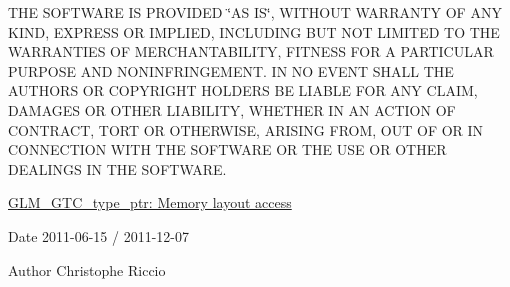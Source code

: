 \-T\-H\-E \-S\-O\-F\-T\-W\-A\-R\-E \-I\-S \-P\-R\-O\-V\-I\-D\-E\-D \char`\"{}\-A\-S I\-S\char`\"{}, \-W\-I\-T\-H\-O\-U\-T \-W\-A\-R\-R\-A\-N\-T\-Y \-O\-F \-A\-N\-Y \-K\-I\-N\-D, \-E\-X\-P\-R\-E\-S\-S \-O\-R \-I\-M\-P\-L\-I\-E\-D, \-I\-N\-C\-L\-U\-D\-I\-N\-G \-B\-U\-T \-N\-O\-T \-L\-I\-M\-I\-T\-E\-D \-T\-O \-T\-H\-E \-W\-A\-R\-R\-A\-N\-T\-I\-E\-S \-O\-F \-M\-E\-R\-C\-H\-A\-N\-T\-A\-B\-I\-L\-I\-T\-Y, \-F\-I\-T\-N\-E\-S\-S \-F\-O\-R \-A \-P\-A\-R\-T\-I\-C\-U\-L\-A\-R \-P\-U\-R\-P\-O\-S\-E \-A\-N\-D \-N\-O\-N\-I\-N\-F\-R\-I\-N\-G\-E\-M\-E\-N\-T. \-I\-N \-N\-O \-E\-V\-E\-N\-T \-S\-H\-A\-L\-L \-T\-H\-E \-A\-U\-T\-H\-O\-R\-S \-O\-R \-C\-O\-P\-Y\-R\-I\-G\-H\-T \-H\-O\-L\-D\-E\-R\-S \-B\-E \-L\-I\-A\-B\-L\-E \-F\-O\-R \-A\-N\-Y \-C\-L\-A\-I\-M, \-D\-A\-M\-A\-G\-E\-S \-O\-R \-O\-T\-H\-E\-R \-L\-I\-A\-B\-I\-L\-I\-T\-Y, \-W\-H\-E\-T\-H\-E\-R \-I\-N \-A\-N \-A\-C\-T\-I\-O\-N \-O\-F \-C\-O\-N\-T\-R\-A\-C\-T, \-T\-O\-R\-T \-O\-R \-O\-T\-H\-E\-R\-W\-I\-S\-E, \-A\-R\-I\-S\-I\-N\-G \-F\-R\-O\-M, \-O\-U\-T \-O\-F \-O\-R \-I\-N \-C\-O\-N\-N\-E\-C\-T\-I\-O\-N \-W\-I\-T\-H \-T\-H\-E \-S\-O\-F\-T\-W\-A\-R\-E \-O\-R \-T\-H\-E \-U\-S\-E \-O\-R \-O\-T\-H\-E\-R \-D\-E\-A\-L\-I\-N\-G\-S \-I\-N \-T\-H\-E \-S\-O\-F\-T\-W\-A\-R\-E.

\hyperlink{group__gtc__type__ptr}{\-G\-L\-M\-\_\-\-G\-T\-C\-\_\-type\-\_\-ptr\-: \-Memory layout access}

\begin{DoxyDate}{\-Date}
2011-\/06-\/15 / 2011-\/12-\/07 
\end{DoxyDate}
\begin{DoxyAuthor}{\-Author}
\-Christophe \-Riccio 
\end{DoxyAuthor}
